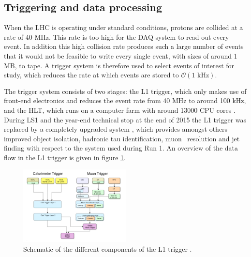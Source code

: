 
\subsection{Triggering and data processing}
\label{sec:CMSLHC_CMS_trigger}
When the \ac{LHC} is operating under standard conditions, protons are collided at a rate
of 40 MHz. This rate is too high for the \ac{DAQ} system to read out every event. In
addition this high collision rate produces such a large number of events that it would
not be feasible to write every single event, with sizes of around 1 MB, to tape. A trigger
system is therefore used to select events of interest for study, which reduces the rate
at which events are stored to  $\mathcal{O}(1 \text{ kHz})$.

The trigger system consists of two stages: the \ac{L1} trigger, which only makes use of
front-end electronics 
and reduces the event rate from 40 MHz to around 100 kHz, and the
\ac{HLT}, which runs on a computer farm with around 13000 CPU cores \cite{cms-trigger}.
During \ac{LS1} and the year-end technical stop at the end of 2015 the \ac{L1} trigger was
replaced by a completely upgraded system \cite{cms-trigger-tdr}, which provides amongst others 
improved object isolation, hadronic tau identification, muon \pT~resolution and
jet finding with respect to the system used during Run 1.
An overview of the data flow in the \ac{L1} trigger is given in figure \ref{fig:CMS_Trigger}.

\begin{figure}[h!]
\begin{center}
\includegraphics[width=0.5\textwidth]{./Detector/Plots/CMSTrigger.png}
\caption{Schematic of the different components of the \ac{L1} trigger \cite{cms-trigger-tdr}.}
\label{fig:CMS_Trigger}
\end{center}
\end{figure}


